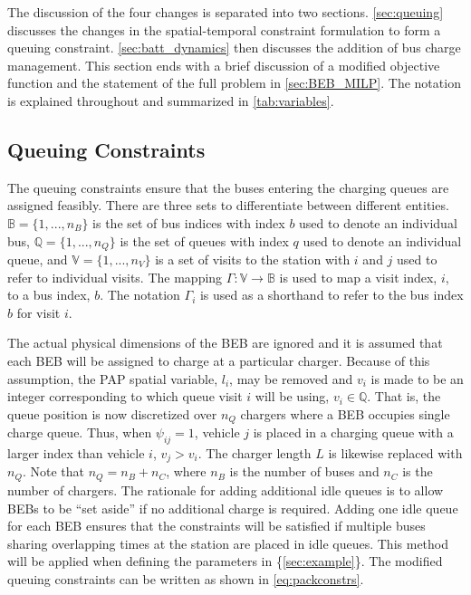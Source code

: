 \documentclass[ee,thesis]{usuthesis}
\begin{document}
The discussion of the four changes is separated into two sections. \autoref{sec:queuing} discusses the changes in the
spatial-temporal constraint formulation to form a queuing constraint. \autoref{sec:batt_dynamics} then discusses the
addition of bus charge management. This section ends with a brief discussion of a modified objective function and the
statement of the full problem in \autoref{sec:BEB_MILP}. The notation is explained throughout and summarized in
\autoref{tab:variables}.

\subsection{Queuing Constraints}
\label{sec:queuing}
\noindent The queuing constraints ensure that the buses entering the charging queues are assigned
feasibly. There are three sets to differentiate between different entities. \(\mathbb{B} = \{1, ..., n_B\}\) is the set of
bus indices with index \(b\) used to denote an individual bus, \(\mathbb{Q} = \{1, ..., n_Q\}\) is the set of queues with index \(q\)
used to denote an individual queue, and \(\mathbb{V} = \{1, ..., n_V\}\) is a set of visits to the station with \(i\) and
\(j\) used to refer to individual visits. The mapping \(\Gamma: \mathbb{V} \rightarrow \mathbb{B}\) is used to map a visit
index, \(i\), to a bus index, \(b\). The notation \(\Gamma_i\) is used as a shorthand to refer to the bus index \(b\) for visit
\(i\).

The actual physical dimensions of the BEB are ignored and it is assumed that each BEB will be assigned to charge at a
particular charger. Because of this assumption, the PAP spatial variable, \(l_i\), may be removed and \(v_i\) is made to be
an integer corresponding to which queue visit \(i\) will be using, \(v_i \in \mathbb{Q}\). That is, the queue position is now
discretized over \(n_Q\) chargers where a BEB occupies single charge queue. Thus, when \(\psi_{ij} = 1\), vehicle \(j\) is placed
in a charging queue with a larger index than vehicle \(i\), \(v_j > v_i\). The charger length \(L\) is likewise replaced with
\(n_Q\). Note that \(n_Q = n_B + n_C\), where \(n_B\) is the number of buses and \(n_C\) is the number of chargers. The
rationale for adding additional idle queues is to allow BEBs to be ``set aside'' if no additional charge is required.
Adding one idle queue for each BEB ensures that the constraints will be satisfied if multiple buses sharing overlapping
times at the station are placed in idle queues. This method will be applied when defining the parameters in
\{\autoref{sec:example}\}. The modified queuing constraints can be written as shown in \autoref{eq:packconstrs}.
\end{document}
